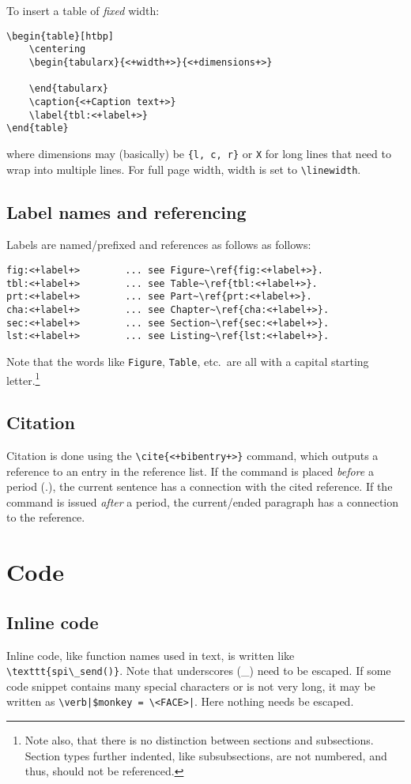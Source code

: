 To insert a table of \emph{fixed} width:
\begin{verbatim}
\begin{table}[htbp]
    \centering
    \begin{tabularx}{<+width+>}{<+dimensions+>}

    \end{tabularx}
    \caption{<+Caption text+>}
    \label{tbl:<+label+>}
\end{table}
\end{verbatim}
where dimensions may (basically) be \texttt{\{l, c, r\}} or \texttt{X} for long lines that need to wrap into multiple lines. For full page width, width is set to \verb|\linewidth|.


\subsection{Label names and referencing}
Labels are named\slash prefixed and references as follows as follows:
\begin{verbatim}
fig:<+label+>        ... see Figure~\ref{fig:<+label+>}. 
tbl:<+label+>        ... see Table~\ref{tbl:<+label+>}.
prt:<+label+>        ... see Part~\ref{prt:<+label+>}.
cha:<+label+>        ... see Chapter~\ref{cha:<+label+>}.
sec:<+label+>        ... see Section~\ref{sec:<+label+>}.
lst:<+label+>        ... see Listing~\ref{lst:<+label+>}.
\end{verbatim}
Note that the words like \texttt{Figure}, \texttt{Table}, etc.\ are all with a capital starting letter.\footnote{Note also, that there is no distinction between sections and subsections. Section types further indented, like subsubsections, are not numbered, and thus, should not be referenced.}


\subsection{Citation}
Citation is done using the \verb|\cite{<+bibentry+>}| command, which outputs a reference to an entry in the reference list. If the command is placed \emph{before} a period (.), the current sentence has a connection with the cited reference. If the command is issued \emph{after} a period, the current\slash ended paragraph has a connection to the reference.


\section{Code}
\label{sec:code}
\subsection{Inline code}
Inline code, like function names used in text, is written like \verb|\texttt{spi\_send()}|. Note that underscores (\_) need to be escaped. If some code snippet contains many special characters or is not very long, it may be written as \verb#\verb|$monkey = \<FACE>|#. Here nothing needs be escaped.


